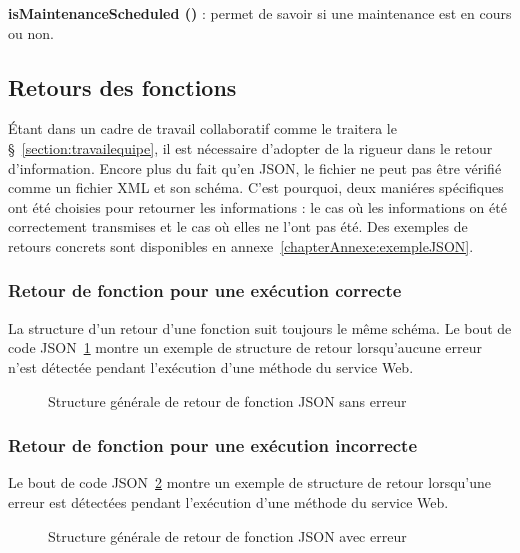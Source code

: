 \noindent\textbf{isMaintenanceScheduled ()} : permet de savoir si une maintenance est en cours ou non.

\subsection{Retours des fonctions}

\'Etant dans un cadre de travail collaboratif comme le traitera le \S~\ref{section:travailequipe}, il est n\'ecessaire d'adopter de la rigueur dans le retour d'information.
Encore plus du fait qu'en JSON, le fichier ne peut pas \^etre v\'erifi\'e comme un fichier XML et son sch\'ema.
C'est pourquoi, deux mani\'eres sp\'ecifiques ont \'et\'e choisies pour retourner les informations : le cas o\`u les informations on \'et\'e correctement transmises et le cas o\`u elles ne l'ont pas \'et\'e.
Des exemples de retours concrets sont disponibles en annexe~\ref{chapterAnnexe:exempleJSON}.

\subsubsection{Retour de fonction pour une ex\'ecution correcte}

La structure d'un retour d'une fonction suit toujours le m\^eme sch\'ema.
Le bout de code JSON~\ref{figure:structureSansErreurJSON} montre un exemple de structure de retour lorsqu'aucune erreur n'est d\'etect\'ee pendant l'ex\'ecution d'une m\'ethode du service Web.

\begin{figure}[!ht]
	\centering
	
	\caption{Structure g\'en\'erale de retour de fonction JSON sans erreur}
	\label{figure:structureSansErreurJSON}

\end{figure}

\subsubsection{Retour de fonction pour une ex\'ecution incorrecte}

Le bout de code JSON~\ref{figure:structureAvecErreurJSON} montre un exemple de structure de retour lorsqu'une erreur est d\'etect\'ees pendant l'ex\'ecution d'une m\'ethode du service Web.

\begin{figure}[!ht]
	\centering
	
	\caption{Structure g\'en\'erale de retour de fonction JSON avec erreur}
	\label{figure:structureAvecErreurJSON}

\end{figure}


